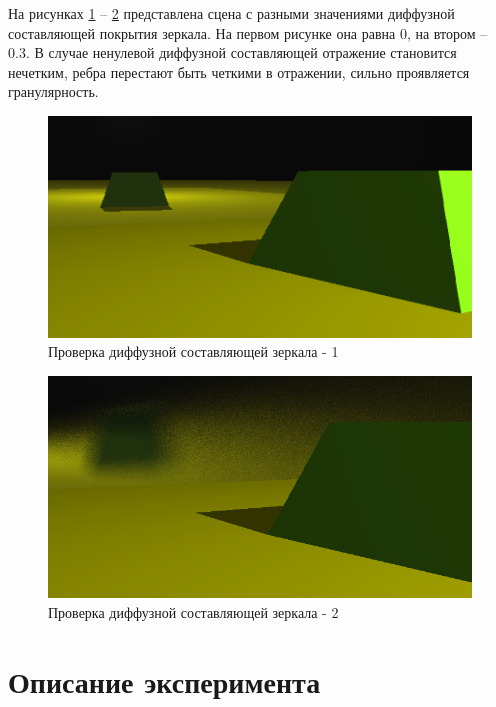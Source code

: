 На рисунках \ref{diffuse_1} -- \ref{diffuse_2} представлена сцена с разными значениями диффузной составляющей покрытия зеркала. На первом рисунке она равна 0, на втором -- 0.3. В случае ненулевой диффузной составляющей отражение становится нечетким, ребра перестают быть четкими в отражении, сильно проявляется гранулярность.

\begin{figure}[H]
	\begin{center}
		\includegraphics[scale=0.41]{assets/diffuse_1.png}
	\end{center}
	\caption{Проверка диффузной составляющей зеркала - 1}
	\label{diffuse_1}
\end{figure}

\begin{figure}[H]
	\begin{center}
		\includegraphics[scale=0.5]{assets/diffuse_2.png}
	\end{center}
	\caption{Проверка диффузной составляющей зеркала - 2}
	\label{diffuse_2}
\end{figure}

\section{Описание эксперимента}

